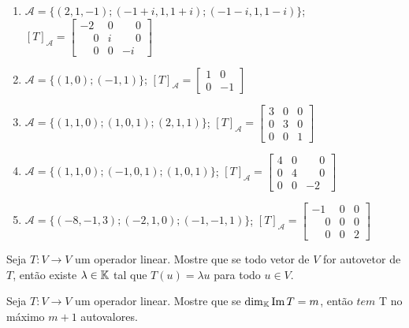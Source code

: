\documentclass[12pt]{exam}
\begin{document}
\begin{exercicio}
\begin{solucao}
\begin{enumerate}[label=({\alph*})]
          \item $\mathcal{A} = \{(2,1,-1);(-1 + i, 1, 1 + i);(-1 - i, 1, 1 - i)\}$; $[T]_\mathcal{A} = \begin{bmatrix} -2 & 0 & \phantom{-} 0\\ \phantom{-} 0 & i & \phantom{-} 0\\ \phantom{-} 0 & 0 & -i\end{bmatrix}$
          \item $\mathcal{A} = \{(1,0);(-1,1)\}$; $[T]_\mathcal{A} = \begin{bmatrix} 1 & 0\\ 0 & -1\end{bmatrix}$
          \item $\mathcal{A} = \{(1,1,0);(1,0,1);(2,1,1)\}$; $[T]_\mathcal{A} = \begin{bmatrix} 3 & 0 & 0\\ 0 & 3 & 0\\ 0 & 0 & 1\end{bmatrix}$
          \item $\mathcal{A} = \{(1,1,0);(-1,0,1);(1,0,1)\}$; $[T]_\mathcal{A} = \begin{bmatrix} 4 & 0 & \phantom{-} 0\\ 0 & 4 & \phantom{-} 0\\ 0 & 0 & -2\end{bmatrix}$
          \item $\mathcal{A} = \{(-8,-1,3);(-2,1,0);(-1,-1,1)\}$; $[T]_\mathcal{A} = \begin{bmatrix} -1 & 0 & 0\\ \phantom{-} 0 & 0 & 0\\ \phantom{-} 0 & 0 & 2\end{bmatrix}$
        \end{enumerate}
  \end{solucao}
\end{exercicio}

\begin{exercicio}
  Seja $T : V \to V$ um operador linear. Mostre que se todo vetor de $V$ for autovetor de $T$, ent\~ao existe $\lambda \in \mathbb{K}$ tal que $T(u) = \lambda u$ para todo $u \in V$.
\end{exercicio}

\begin{exercicio}
  Seja $T : V \to V$ um operador linear. Mostre que se $\dim_{\mathbb{K}}{\rm Im\,} T = m$, ent\~ao $tem$ T no m\'aximo $m + 1$ autovalores.
\end{exercicio}
\end{document}
